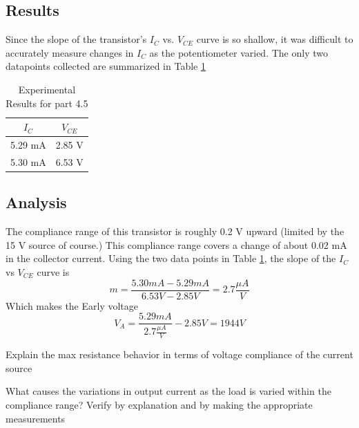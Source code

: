 \documentclass[12pt,letterpaper]{report}
\begin{document}
\subsection*{Results}
Since the slope of the transistor's $I_C$ vs. $V_{CE}$ curve is so shallow, it was difficult to accurately measure changes in $I_C$ as the potentiometer varied. The only two datapoints collected are summarized in Table \ref{table:4-6_results}

\begin{table}[ht]
\caption{Experimental Results for part 4.5} %
\centering 
    \begin{tabular}{| c | c |}
    \hline  
    $I_C$ & $V_{CE}$\\
    \hline
    5.29 mA & 2.85 V\\
    5.30 mA & 6.53 V\\
    \hline
    \end{tabular}
    \label{table:4-6_results}
\end{table}

\subsection*{Analysis}
The compliance range of this transistor is roughly 0.2 V upward (limited by the 15 V source of course.) This compliance range covers a change of about 0.02 mA in the collector current. Using the two data points in Table \ref{table:4-6_results}, the slope of the $I_C$ vs $V_{CE}$ curve is
$$
m = \frac{5.30 mA - 5.29 mA}{6.53V - 2.85V} = 2.7 \frac{\mu A}{V}
$$
Which makes the Early voltage
$$
V_A = \frac{5.29 mA}{2.7 \frac{\mu A}{V}} - 2.85 V = 1944 V
$$

Explain the max resistance behavior in terms of voltage compliance of the current source

What causes the variations in output current as the load is varied within the compliance range? Verify by explanation and by making the appropriate measurements
\end{document}
